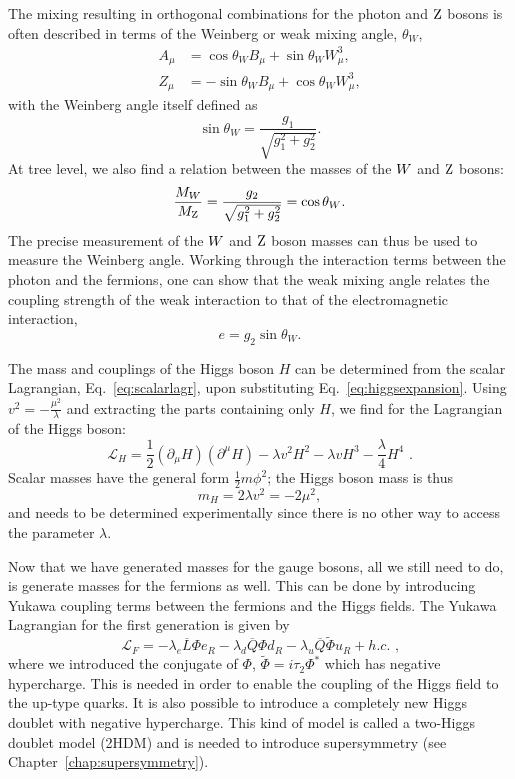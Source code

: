 The mixing resulting in orthogonal combinations for the photon and $\mathrm{Z}$ bosons is often described
in terms of the Weinberg or weak mixing angle, $\theta_W$,
\begin{align}
  A_\mu &=  \cos \theta_W B_\mu + \sin \theta_W W_\mu^3,\\
  Z_\mu &=  - \sin \theta_W B_\mu + \cos \theta_W W_\mu^3, 
\end{align}
with the Weinberg angle itself defined as
\begin{equation}
  \sin \theta_W = \frac{g_1}{\sqrt{g_1^2 + g_2^2}} .
\end{equation}
At tree level, we also find a relation between the masses of the $W$ and $\mathrm{Z}$ bosons: 
\begin{equation}
  \frac{M_{W}}{M_{\mathrm{Z}}} = \frac{g_2}{\sqrt{g_1^2 + g_2^2}} = \cos \theta_W . 
\end{equation}
The precise measurement of the $W$ and $\mathrm{Z}$ boson masses can thus be used to measure the Weinberg
angle.
Working through the interaction terms between the photon and the fermions, one can show that the
weak mixing angle relates the coupling strength of the weak interaction to that of the
electromagnetic interaction, 
\begin{equation}
  e = g_2 \sin \theta_W .
\end{equation}

The mass and
couplings of the Higgs boson $H$ can be determined from the scalar Lagrangian,
Eq.~\ref{eq:scalarlagr}, upon substituting Eq.~\ref{eq:higgsexpansion}. 
Using $v^2 = -\frac{\mu^2}{\lambda}$ and extracting the parts containing only $H$, we find for the
Lagrangian of the Higgs boson:
\begin{equation}
  \mathcal{L}_H = \frac{1}{2} (\partial_\mu H)(\partial^\mu H) - \lambda v^2 H^2 - \lambda v H^3 -
\frac{\lambda}{4} H^4 \textrm{ .}
\end{equation}
Scalar masses have the general form $\frac{1}{2} m \phi^2$; the Higgs boson mass is thus
\begin{equation}
m_H =  2 \lambda v^2 = - 2 \mu^2,
\end{equation}
and needs to be determined experimentally since there is no other way to access the parameter
$\lambda$. 

Now that we have generated masses for the gauge bosons, all we still need to do, is
generate masses for the fermions as well. This can be done by introducing Yukawa coupling terms
between the fermions and the Higgs fields. 
The Yukawa Lagrangian for the first generation is given by
\begin{equation}
  \mathcal{L}_F = - \lambda_e \overline{L} \Phi e_R - \lambda_d \overline{Q} \Phi d_R - \lambda_u
\overline{Q} \widetilde{\Phi} u_R + h.c. \textrm{ ,}
  \label{eq:Lag_Yuk}
\end{equation}
where we introduced the conjugate of $\Phi$, $\widetilde{\Phi} = i \tau_2 \Phi^*$ which has negative
hypercharge. 
This is needed in order to enable the coupling of the Higgs field to the up-type quarks.
It is also possible to
introduce a completely new Higgs doublet with negative hypercharge. This kind of model is called a
two-Higgs doublet model (2HDM) and is needed to introduce supersymmetry (see
Chapter~\ref{chap:supersymmetry}). 

